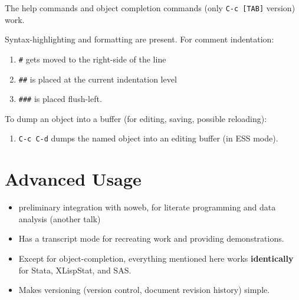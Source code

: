 \documentclass{article}
\begin{document}
The help commands and object completion commands (only \verb+C-c [TAB]+
version) work.

Syntax-highlighting and formatting are present.  For comment indentation:
\begin{enumerate}
\item \verb+#+ gets moved to the right-side of the line
\item \verb+##+ is placed at the current indentation level
\item \verb+###+ is placed flush-left.
\end{enumerate}

To dump an object into a buffer (for editing, saving, possible reloading):
\begin{enumerate}
\item \verb+C-c C-d+ dumps the named object into an editing buffer (in
  ESS mode).
\end{enumerate}


\section{Advanced Usage}
\label{sec:advanced}

\begin{itemize}
\item preliminary integration with noweb, for literate programming and
  data analysis (another talk)
\item Has a transcript mode for recreating work and providing
  demonstrations.
\item Except for object-completion, everything mentioned here works
  \textbf{identically} for Stata, XLispStat, and SAS.
\item Makes versioning (version control, document revision history)
  simple.
\end{itemize}
\end{document}
